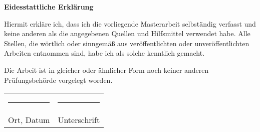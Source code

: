 \newpage
\thispagestyle{empty}
\mbox{}

\newpage
\thispagestyle{empty}

\vspace*{3cm}
\begin{center}
    {\Large \textbf{Eidesstattliche Erklärung}}
\end{center}

\vspace{2cm}

Hiermit erkläre ich, dass ich die vorliegende Masterarbeit selbständig verfasst und keine anderen als die angegebenen Quellen und Hilfsmittel verwendet habe. Alle Stellen, die wörtlich oder sinngemäß aus veröffentlichten oder unveröffentlichten Arbeiten entnommen sind, habe ich als solche kenntlich gemacht.

\vspace{1cm}

Die Arbeit ist in gleicher oder ähnlicher Form noch keiner anderen Prüfungsbehörde vorgelegt worden.

\vspace{3cm}

\noindent
\begin{tabular}{@{}p{7cm}p{7cm}@{}}
    \rule{6cm}{0.5pt} & \rule{6cm}{0.5pt} \\
    Ort, Datum & Unterschrift \\
\end{tabular}